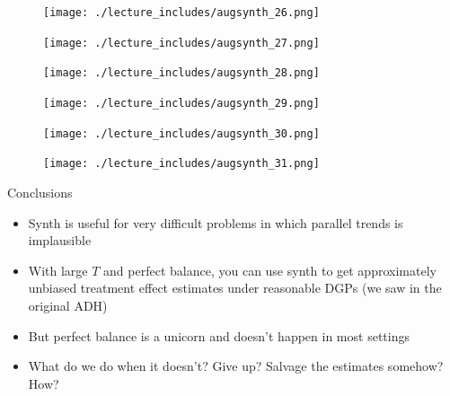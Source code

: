 \documentclass{beamer}
\begin{document}
\begin{frame}[plain]

	\begin{figure}
	\texttt{[image: ./lecture\_includes/augsynth\_26.png]}
	\end{figure}

\end{frame}
\begin{frame}[plain]

	\begin{figure}
	\texttt{[image: ./lecture\_includes/augsynth\_27.png]}
	\end{figure}

\end{frame}
\begin{frame}[plain]

	\begin{figure}
	\texttt{[image: ./lecture\_includes/augsynth\_28.png]}
	\end{figure}

\end{frame}
\begin{frame}[plain]

	\begin{figure}
	\texttt{[image: ./lecture\_includes/augsynth\_29.png]}
	\end{figure}

\end{frame}
\begin{frame}[plain]

	\begin{figure}
	\texttt{[image: ./lecture\_includes/augsynth\_30.png]}
	\end{figure}

\end{frame}
\begin{frame}[plain]

	\begin{figure}
	\texttt{[image: ./lecture\_includes/augsynth\_31.png]}
	\end{figure}

\end{frame}

\begin{frame}{Conclusions}

\begin{itemize}
\item Synth is useful for very difficult problems in which parallel trends is implausible
\item With large $T$ and perfect balance, you can use synth to get approximately unbiased treatment effect estimates under reasonable DGPs (we saw in the original ADH)
\item But perfect balance is a unicorn and doesn't happen in most settings
\item What do we do when it doesn't?  Give up?  Salvage the estimates somehow? How?
\end{itemize}

\end{frame}
\end{document}
